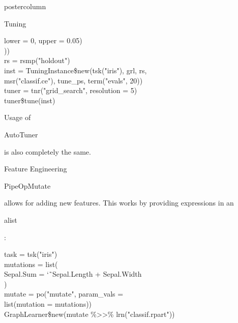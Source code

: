 \documentclass{beamer}
\newcommand{\codeinline}[1]{\begin{codeboxinline}#1\end{codeboxinline}}
\begin{document}
\begin{frame}[fragile]{}
\begin{columns}
\begin{column}{.245\textwidth}
\begin{beamercolorbox}[center]{postercolumn}
\begin{minipage}{.98\textwidth}
{\begin{myblock}{Tuning}
\begin{codeboxexample}
{               \hspace*{2ex} lower = 0, upper = 0.05)\\
               ))\\
               rs = rsmp("holdout")\\
               inst = TuningInstance\$new(tsk("iris"), grl, rs,\\
               \hspace*{1ex} msr("classif.ce"), tune\_ps, term("evals", 20))\\
               tuner = tnr("grid\_search", resolution = 5)\\
               tuner\$tune(inst)
           }
				\end{codeboxexample}
            Usage of \codeinline{AutoTuner} is also completely the same.
            \end{myblock}
              \vspace{-1.0em}
          \begin{myblock}{Feature Engineering}
            \codeinline{PipeOpMutate} allows for adding new features. This works by providing expressions in an \codeinline{alist}:
            \begin{codeboxexample}
              \footnotesize{
              task = tsk("iris")\\
              mutations = list(\\
              \hspace*{1ex} Sepal.Sum = \char`\~ \ Sepal.Length + Sepal.Width\\
              )\\
              mutate = po("mutate", param\_vals =\\
              \hspace*{1ex} list(mutation = mutations))\\
              GraphLearner\$new(mutate \%>{}>\% lrn("classif.rpart"))
}
\end{codeboxexample}
\end{myblock}}
\end{minipage}
\end{beamercolorbox}
\end{column}
\end{columns}
\end{frame}
\end{document}
